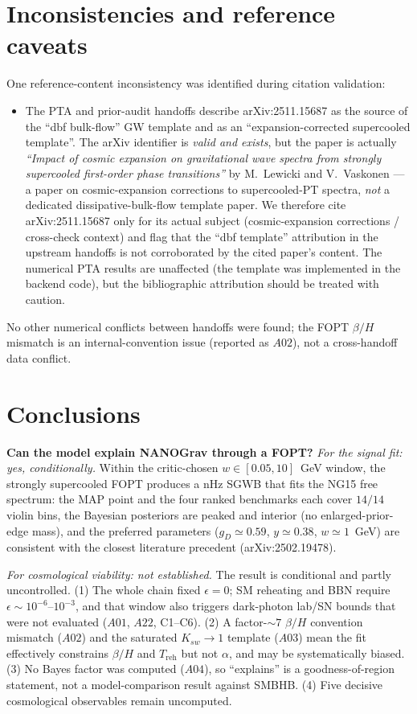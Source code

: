 \documentclass[11pt]{article}
\newcommand{\gD}{g_{D}}
\newcommand{\Treh}{T_{\mathrm{reh}}}
\newcommand{\betaH}{\beta/H}
\begin{document}
\section{Inconsistencies and reference caveats}
\label{sec:inconsistencies}
One reference-content inconsistency was identified during citation validation:
\begin{itemize}
\item The PTA and prior-audit handoffs describe arXiv:2511.15687 as the source of the
``dbf bulk-flow'' GW template and as an ``expansion-corrected supercooled template''.
The arXiv identifier is \emph{valid and exists}, but the paper is actually
\emph{``Impact of cosmic expansion on gravitational wave spectra from strongly supercooled
first-order phase transitions''} by M.~Lewicki and V.~Vaskonen --- a paper on cosmic-expansion
corrections to supercooled-PT spectra, \emph{not} a dedicated dissipative-bulk-flow template
paper. We therefore cite arXiv:2511.15687 only for its actual subject (cosmic-expansion
corrections / cross-check context) and flag that the ``dbf template'' attribution in the
upstream handoffs is not corroborated by the cited paper's content. The numerical PTA results
are unaffected (the template was implemented in the backend code), but the bibliographic
attribution should be treated with caution.
\end{itemize}
No other numerical conflicts between handoffs were found; the FOPT $\betaH$ mismatch is an
internal-convention issue (reported as $A02$), not a cross-handoff data conflict.

\section{Conclusions}
\label{sec:conclusions}
\textbf{Can the model explain NANOGrav through a FOPT?}
\emph{For the signal fit: yes, conditionally.} Within the critic-chosen $w\in[0.05,10]$~GeV window,
the strongly supercooled FOPT produces a nHz SGWB that fits the NG15 free spectrum: the MAP point
and the four ranked benchmarks each cover $14/14$ violin bins, the Bayesian posteriors are peaked
and interior (no enlarged-prior-edge mass), and the preferred parameters
($\gD\simeq0.59$, $y\simeq0.38$, $w\simeq1$~GeV) are consistent with the closest literature
precedent (arXiv:2502.19478).

\emph{For cosmological viability: not established.} The result is conditional and partly
uncontrolled. (1) The whole chain fixed $\epsilon=0$; SM reheating and BBN require
$\epsilon\sim10^{-6}\text{--}10^{-3}$, and that window also triggers dark-photon lab/SN bounds that
were not evaluated ($A01$, $A22$, C1--C6). (2) A factor-$\sim7$ $\betaH$ convention mismatch
($A02$) and the saturated $K_{sw}\to1$ template ($A03$) mean the fit effectively constrains
$\betaH$ and $\Treh$ but not $\alpha$, and may be systematically biased. (3) No Bayes factor was
computed ($A04$), so ``explains'' is a goodness-of-region statement, not a model-comparison result
against SMBHB. (4) Five decisive cosmological observables remain uncomputed.
\end{document}
